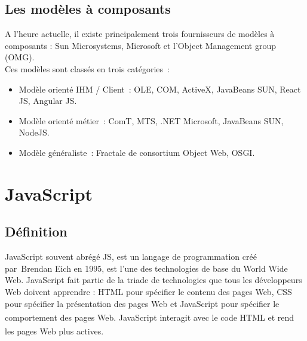 \documentclass[12pt]{report}
\begin{document}
\subsection{Les modèles à composants}
A l’heure actuelle, il existe principalement trois fournisseurs de modèles à composants : Sun Microsystems, Microsoft et l’Object Management group (OMG).
\\
Ces modèles sont classés en trois catégories :

\begin{itemize}
    \item Modèle orienté IHM / Client : OLE, COM, ActiveX, JavaBeans SUN, React JS, Angular JS.
    \item Modèle orienté métier : ComT, MTS, .NET Microsoft, JavaBeans SUN, NodeJS.
    \item Modèle généraliste : Fractale de consortium Object Web, OSGI.
\end{itemize}

\newpage

\section{JavaScript}
\subsection{Définition}
\vspace{0.1in}
JavaScript souvent abrégé JS, est un langage de programmation créé par Brendan Eich en 1995, est l’une des technologies de base du World Wide Web. JavaScript fait partie de la triade de technologies que tous les développeurs Web doivent apprendre : HTML pour spécifier le contenu des pages Web, CSS pour spécifier la présentation des pages Web et JavaScript pour spécifier le comportement des pages Web. \textsuperscript{\cite{flanagan2013javascript}}
JavaScript interagit avec le code HTML et rend les pages Web plus actives. \textsuperscript{\cite{paulson2005building}}
\end{document}

